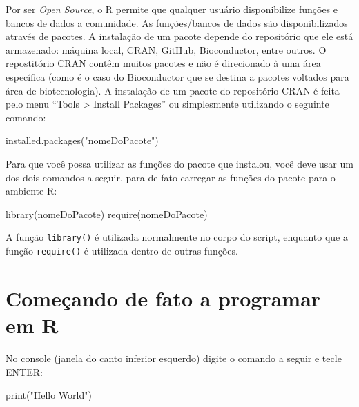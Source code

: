 \documentclass[
]{book}
\newenvironment{Shaded}{\begin{snugshade}}{\end{snugshade}}
\newcommand{\FunctionTok}[1]{\textcolor[rgb]{0.00,0.00,0.00}{#1}}
\newcommand{\NormalTok}[1]{#1}
\newcommand{\StringTok}[1]{\textcolor[rgb]{0.31,0.60,0.02}{#1}}
\theoremstyle{definition}
\theoremstyle{definition}
\theoremstyle{definition}
\theoremstyle{definition}
\theoremstyle{remark}
\begin{document}
Por ser \emph{Open Source}, o R permite que qualquer usuário disponibilize funções e bancos de dados a comunidade. As funções/bancos de dados são disponibilizados através de pacotes. A instalação de um pacote depende do repositório que ele está armazenado: máquina local, CRAN, GitHub, Bioconductor, entre outros. O repostitório CRAN contêm muitos pacotes e não é direcionado à uma área específica (como é o caso do Bioconductor que se destina a pacotes voltados para área de biotecnologia). A instalação de um pacote do repositório CRAN é feita pelo menu ``Tools \textgreater{} Install Packages'' ou simplesmente utilizando o seguinte comando:

\begin{Shaded}
\begin{Highlighting}[]
\FunctionTok{installed.packages}\NormalTok{(}\StringTok{"nomeDoPacote"}\NormalTok{)}
\end{Highlighting}
\end{Shaded}

Para que você possa utilizar as funções do pacote que instalou, você deve usar um dos dois comandos a seguir, para de fato carregar as funções do pacote para o ambiente R:

\begin{Shaded}
\begin{Highlighting}[]
\FunctionTok{library}\NormalTok{(nomeDoPacote)}
\FunctionTok{require}\NormalTok{(nomeDoPacote)}
\end{Highlighting}
\end{Shaded}

A função \texttt{library()} é utilizada normalmente no corpo do script, enquanto que a função \texttt{require()} é utilizada dentro de outras funções.

\hypertarget{comeuxe7ando-de-fato-a-programar-em-r}{%
\section{Começando de fato a programar em R}\label{comeuxe7ando-de-fato-a-programar-em-r}}

No console (janela do canto inferior esquerdo) digite o comando a seguir e tecle ENTER:

\begin{Shaded}
\begin{Highlighting}[]
\FunctionTok{print}\NormalTok{(}\StringTok{"Hello World"}\NormalTok{)}
\end{Highlighting}
\end{Shaded}
\end{document}
